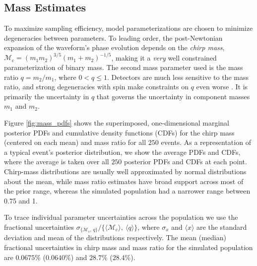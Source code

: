 \subsection{Mass Estimates}\label{sec:mass}
To maximize sampling efficiency, model parameterizations are chosen to minimize degeneracies between parameters.  To leading order, the post-Newtonian expansion of the waveform's phase evolution depends on the \emph{chirp mass}, $\mathcal{M}_\mathrm{c} = (m_1 m_2)^{3/5} (m_1 + m_2)^{-1/5}$, making it a \emph{very} well constrained parameterization of binary mass.  The second mass parameter used is the mass ratio $q = m_2/m_1$, where $0 < q \leq 1$.  Detectors are much less sensitive to the mass ratio, and strong degeneracies with spin make constraints on $q$ even worse \citep{Cutler_1994}.  It is primarily the uncertainty in $q$ that governs the uncertainty in component masses $m_1$ and $m_2$.

Figure \ref{fig:mass_pdfs} shows the superimposed, one-dimensional marginal posterior PDFs and cumulative density functions (CDFs) for the chirp mass (centered on each mean) and mass ratio for all $250$ events.  As a representation of a typical event's posterior distribution, we show the average PDFs and CDFs, where the average is taken over all $250$ posterior PDFs and CDFs at each point. Chirp-mass distributions are usually well approximated by normal distributions about the mean, while mass ratio estimates have broad support across most of the prior range, whereas the simulated population had a narrower range between 0.75 and 1.

To trace individual parameter uncertainties across the population we use the fractional uncertainties $\sigma_{\{\mathcal{M}_\mathrm{c},\,q\}}/\{\langle\mathcal{M}_\mathrm{c}\rangle,~\langle q\rangle\}$, where $\sigma_x$ and $\langle x\rangle$ are the standard deviation and mean of the distributions respectively. The mean (median) fractional uncertainties in chirp mass and mass ratio for the simulated population are $0.0675\%$ ($0.0640\%$) and $28.7\%$ ($28.4\%$).


